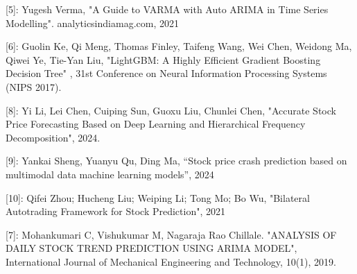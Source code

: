 \documentclass[conference]{IEEEtran}
\begin{document}
[5]: Yugesh Verma, "A Guide to VARMA with Auto ARIMA in Time Series Modelling". analyticsindiamag.com, 2021 

[6]: Guolin Ke, Qi Meng, Thomas Finley, Taifeng Wang, Wei Chen, Weidong Ma, Qiwei Ye, Tie-Yan Liu, "LightGBM: A Highly Efficient Gradient Boosting
Decision Tree" , 31st Conference on Neural Information Processing Systems (NIPS 2017).


[8]: Yi Li, Lei Chen, Cuiping Sun, Guoxu Liu, Chunlei Chen, "Accurate Stock Price Forecasting Based on Deep Learning and Hierarchical Frequency Decomposition", 2024.

[9]: Yankai Sheng,  Yuanyu Qu,  Ding Ma, “Stock price crash prediction based on multimodal data machine learning models”, 2024

[10]: Qifei Zhou; Hucheng Liu; Weiping Li; Tong Mo; Bo Wu, "Bilateral Autotrading Framework for Stock Prediction", 2021



[7]: Mohankumari C, Vishukumar M, Nagaraja Rao Chillale. "ANALYSIS OF DAILY STOCK TREND PREDICTION USING ARIMA MODEL", International Journal
of Mechanical Engineering and Technology, 10(1), 2019.
\end{document}
